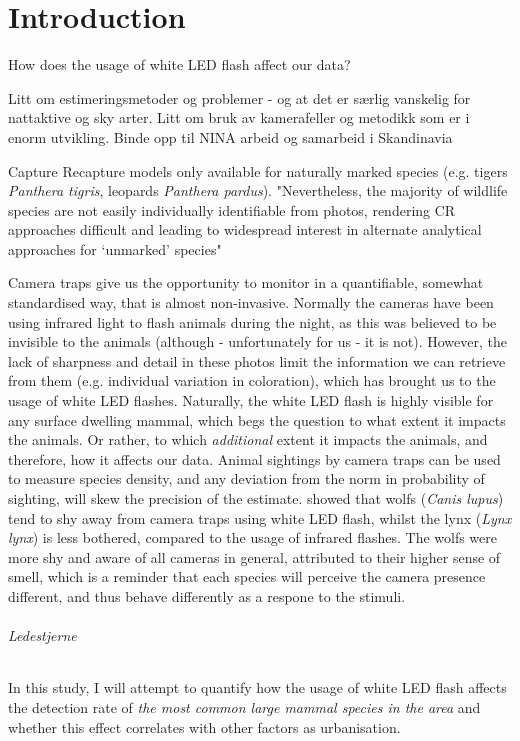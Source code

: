 \chapter{Introduction}


How does the usage of white LED flash affect our data?



Litt om estimeringsmetoder og problemer - og at det er særlig vanskelig for nattaktive og sky arter.
Litt om bruk av kamerafeller og metodikk som er i enorm utvikling. Binde opp til NINA arbeid og samarbeid i Skandinavia


Capture Recapture models only available for naturally marked species (e.g. tigers \textit{Panthera tigris}, leopards \textit{Panthera pardus}). 
"Nevertheless, the majority of wildlife species are not easily individually identifiable from photos, rendering CR approaches difficult and leading to widespread interest in alternate analytical approaches for ‘unmarked’ species" \cite{Burton2015} %


Camera traps give us the opportunity to monitor in a quantifiable, somewhat standardised way, that is almost non-invasive. 
Normally the cameras have been using infrared light to flash animals during the night, as this was believed to be invisible to the animals (although - unfortunately for us - it is not).
However, the lack of sharpness and detail in these photos limit the information we can retrieve from them (e.g. individual variation in coloration), which has brought us to the usage of white LED flashes.
Naturally, the white LED flash is highly visible for any surface dwelling mammal, which begs the question to what extent it impacts the animals. Or rather, to which \textit{additional} extent it impacts the animals, and therefore, how it affects our data. Animal sightings by camera traps can be used to measure species density, and any deviation from the norm in probability of sighting, will skew the precision of the estimate.
\cite{Beddari2019} showed that wolfs (\textit{Canis lupus}) tend to shy away from camera traps using white LED flash, whilst the lynx (\textit{Lynx lynx}) is less bothered, compared to the usage of infrared flashes. The wolfs were more shy and aware of all cameras in general, attributed to their higher sense of smell, which is a reminder that each species will perceive the camera presence different, and thus behave differently as a respone to the stimuli.

\subparagraph{Ledestjerne}
In this study, I will attempt to quantify how the usage of white LED flash affects the detection rate of \textsl{the most common large mammal species in the area} and whether this effect correlates with other factors as urbanisation.


